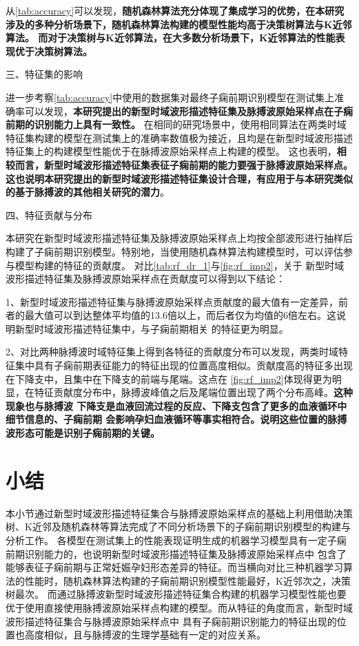 从\autoref{tab:accuracy}可以发现，\textbf{随机森林算法充分体现了集成学习的优势，在本研究涉及的多种分析场景下，随机森林算法构建的模型性能均高于决策树算法与K近邻算法。
而对于决策树与K近邻算法，在大多数分析场景下，K近邻算法的性能表现优于决策树算法。}

三、特征集的影响

进一步考察\autoref{tab:accuracy}中使用的数据集对最终子痫前期识别模型在测试集上准确率可以发现，\textbf{本研究提出的新型时域波形描述特征集及脉搏波原始采样点在子痫前期的识别能力上具有一致性。}
在相同的研究场景中，使用相同算法在两类时域特征集构建的模型在测试集上的准确率数值极为接近，且均是在新型时域波形描述特征集上的构建模型性能优于在脉搏波原始采样点上构建的模型。
这也表明，\textbf{相较而言，新型时域波形描述特征集表征子痫前期的能力要强于脉搏波原始采样点。这也说明本研究提出的新型时域波形描述特征集设计合理，有应用于与本研究类似的基于脉搏波的其他相关研究的潜力}。

四、特征贡献与分布

本研究在新型时域波形描述特征集及脉搏波原始采样点上均按全部波形进行抽样后构建了子痫前期识别模型。特别地，当使用随机森林算法构建模型时，可以评估参与模型构建的特征的贡献度。
对比\autoref{tab:rf_dr_1}与\autoref{fig:rf_imp2}，关于
新型时域波形描述特征集及脉搏波原始采样点在贡献度可以得到以下结论：

1、新型时域波形描述特征集与脉搏波原始采样点贡献度的最大值有一定差异，前者的最大值可以到达整体平均值的13.6倍以上，而后者仅为均值的6倍左右。这说明新型时域波形描述特征集中，与子痫前期相关
的特征更为明显。

2、对比两种脉搏波时域特征集上得到各特征的贡献度分布可以发现，两类时域特征集中具有子痫前期表征能力的特征出现的位置高度相似。贡献度高的特征多出现在下降支中，且集中在下降支的前端与尾端。这点在
\autoref{fig:rf_imp2}体现得更为明显，在特征贡献度分布中，脉搏波峰值之后及尾端位置出现了两个分布高峰。\textbf{这种现象也与脉搏波
下降支是血液回流过程的反应、下降支包含了更多的血液循环中细节信息的、子痫前期
会影响孕妇血液循环等事实相符合。说明这些位置的脉搏波形态可能是识别子痫前期的关键。}

\section{小结}
本小节通过新型时域波形描述特征集合与脉搏波原始采样点的基础上利用借助决策树、K近邻及随机森林等算法完成了不同分析场景下的子痫前期识别模型的构建与分析工作。
各模型在测试集上的性能表现证明生成的机器学习模型具有一定子痫前期识别能力的，也说明新型时域波形描述特征集及脉搏波原始采样点中
包含了能够表征子痫前期与正常妊娠孕妇形态差异的特征。而当横向对比三种机器学习算法的性能时，随机森林算法构建的子痫前期识别模型性能最好，K近邻次之，决策树最次。
而通过脉搏波新型时域波形描述特征集合构建的机器学习模型性能也要优于使用直接使用脉搏波原始采样点构建的模型。而从特征的角度而言，新型时域波形描述特征集合与脉搏波原始采样点中
具有子痫前期识别能力的特征出现的位置也高度相似，且与脉搏波的生理学基础有一定的对应关系。
